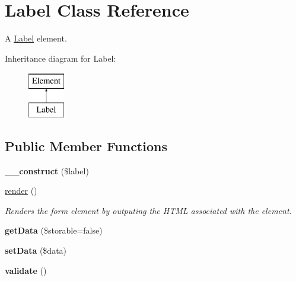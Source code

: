 \hypertarget{class_label}{
\section{Label Class Reference}
\label{class_label}
}


A \hyperlink{class_label}{Label} element.  


Inheritance diagram for Label:\begin{figure}[H]
\begin{center}
\leavevmode
\includegraphics[height=2.000000cm]{class_label}
\end{center}
\end{figure}
\subsection*{Public Member Functions}
\begin{DoxyCompactItemize}
\item 
\hypertarget{class_label_a4fb2904a0796cf48db0e4889a7f2fff0}{
{\bfseries \_\-\_\-construct} (\$label)}
\label{class_label_a4fb2904a0796cf48db0e4889a7f2fff0}

\item 
\hyperlink{class_label_aec2dd13c9492c75c8709a871391524f2}{render} ()
\begin{DoxyCompactList}\small\item\em Renders the form element by outputing the HTML associated with the element. \item\end{DoxyCompactList}\item 
\hypertarget{class_label_aca162fc9f894a10baa317dff22c0c9e3}{
{\bfseries getData} (\$storable=false)}
\label{class_label_aca162fc9f894a10baa317dff22c0c9e3}

\item 
\hypertarget{class_label_afb3dbce416acdbf30d8ffc0fc8a99682}{
{\bfseries setData} (\$data)}
\label{class_label_afb3dbce416acdbf30d8ffc0fc8a99682}

\item 
\hypertarget{class_label_a9418c1059df888820545fb0a1279055c}{
{\bfseries validate} ()}
\label{class_label_a9418c1059df888820545fb0a1279055c}

\end{DoxyCompactItemize}



